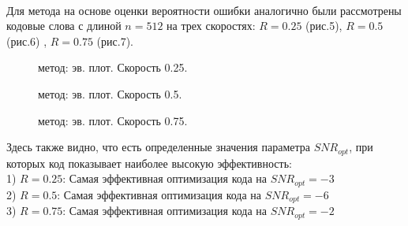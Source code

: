 \documentclass{llncs}
\begin{document}
\\

Для метода на основе оценки вероятности ошибки аналогично были рассмотрены кодовые слова с длиной $n = 512$ на трех скоростях: $R =  0.25$ (рис.5), $R = 0.5$ (рис.6) , $R = 0.75$ (рис.7).
\\
\begin{figure}[!h]
\caption{метод: эв. плот. Скорость 0.25. }
\end{figure}
\begin{figure}[!h]
\caption{метод: эв. плот. Скорость 0.5.}
\end{figure}
\begin{figure}[!h]
\caption{метод: эв. плот. Скорость 0.75.}
\label{ris:image}
\end{figure}
Здесь также видно, что есть определенные значения  параметра  $SNR_{opt}$, при которых код показывает наиболее высокую эффективность:
\\
1) $R=0.25$: Самая эффективная оптимизация кода на $ SNR_{opt} = -3$
\\
2) $R=0.5$:  Самая эффективная оптимизация кода на $ SNR_ {opt} = -6$
\\
3) $R=0.75$: Самая эффективная оптимизация кода на $ SNR_{opt} = -2$
\end{document}
